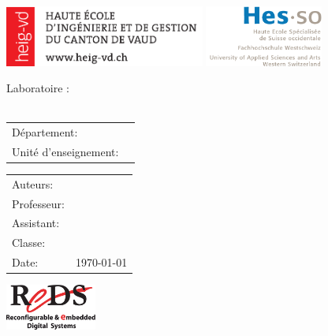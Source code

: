 


\begin{center}
\includegraphics[height=2cm]{./images/logo_heig.pdf}
\hfill \includegraphics[height=2cm]{./images/logo_hesso.pdf}
\end{center}

\vfill

\begin{center}
	\Large Laboratoire \nbrlabo:\\
	\huge \titre \\
\end{center}


\begin{center}
	\begin{tabular}{l l}
		Département:          & \departement\\
		Unité d'enseignement: & \cours\\
	\end{tabular}
\end{center}


\vfill


\vfill

\begin{tabular}{l l}
	\Large	Auteurs:   			  & \Large \nomAuteur\\
	Professeur:           & \prof\\
	Assistant:			  & \assistant\\
	Classe:               & \classe\\
	Date:                 & \today\\
\end{tabular}

\vfill

\begin{center}
\includegraphics[height=1.5cm]{./images/logo_reds.pdf}
\end{center}